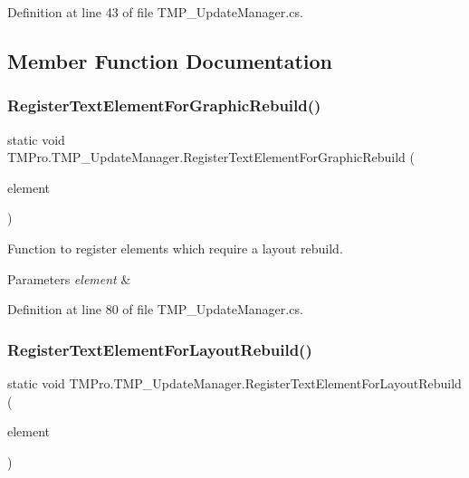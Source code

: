 Definition at line 43 of file T\+M\+P\+\_\+\+Update\+Manager.\+cs.



\subsection{Member Function Documentation}
\mbox{\label{class_t_m_pro_1_1_t_m_p___update_manager_a110903981e6a8c00d95957b707cc3c99}} 
\subsubsection{\texorpdfstring{RegisterTextElementForGraphicRebuild()}{RegisterTextElementForGraphicRebuild()}}
{\footnotesize\ttfamily static void T\+M\+Pro.\+T\+M\+P\+\_\+\+Update\+Manager.\+Register\+Text\+Element\+For\+Graphic\+Rebuild (\begin{DoxyParamCaption}\item[{\mbox{\hyperlink{class_t_m_pro_1_1_t_m_p___text}{T\+M\+P\+\_\+\+Text}}}]{element }\end{DoxyParamCaption})\hspace{0.3cm}{\ttfamily [static]}}



Function to register elements which require a layout rebuild. 


\begin{DoxyParams}{Parameters}
{\em element} & \\
\hline
\end{DoxyParams}


Definition at line 80 of file T\+M\+P\+\_\+\+Update\+Manager.\+cs.

\mbox{\label{class_t_m_pro_1_1_t_m_p___update_manager_a634231dcd884e950e0b9c7527bc39311}} 
\subsubsection{\texorpdfstring{RegisterTextElementForLayoutRebuild()}{RegisterTextElementForLayoutRebuild()}}
{\footnotesize\ttfamily static void T\+M\+Pro.\+T\+M\+P\+\_\+\+Update\+Manager.\+Register\+Text\+Element\+For\+Layout\+Rebuild (\begin{DoxyParamCaption}\item[{\mbox{\hyperlink{class_t_m_pro_1_1_t_m_p___text}{T\+M\+P\+\_\+\+Text}}}]{element }\end{DoxyParamCaption})\hspace{0.3cm}{\ttfamily [static]}}



